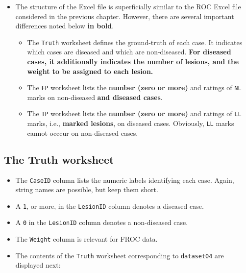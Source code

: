 \documentclass[]{book}
\providecommand{\tightlist}{%
  \setlength{\itemsep}{0pt}\setlength{\parskip}{0pt}}
\begin{document}
\begin{itemize}
\item
  The structure of the Excel file is superficially similar to the ROC Excel file considered in the previous chapter. However, there are several important differences noted below \textbf{in bold}.

  \begin{itemize}
  \tightlist
  \item
    The \texttt{Truth} worksheet defines the ground-truth of each case. It indicates which cases are diseased and which are non-diseased. \textbf{For diseased cases, it additionally indicates the number of lesions, and the weight to be assigned to each lesion.}
  \item
    The \texttt{FP} worksheet lists the \textbf{number (zero or more)} and ratings of \texttt{NL} marks on non-diseased \textbf{and diseased cases}.
  \item
    The \texttt{TP} worksheet lists the \textbf{number (zero or more)} and ratings of \texttt{LL} marks, i.e., \textbf{marked lesions}, on diseased cases. Obviously, \texttt{LL} marks cannot occcur on non-diseased cases.
  \end{itemize}
\end{itemize}

\hypertarget{the-truth-worksheet}{%
\subsection{The Truth worksheet}\label{the-truth-worksheet}}

\begin{itemize}
\tightlist
\item
  The \texttt{CaseID} column lists the numeric labels identifying each case. Again, string names are possible, but keep them short.
\item
  A \texttt{1}, or more, in the \texttt{LesionID} column denotes a diseased case.
\item
  A \texttt{0} in the \texttt{LesionID} column denotes a non-diseased case.
\item
  The \texttt{Weight} column is relevant for FROC data.
\item
  The contents of the \texttt{Truth} worksheet corresponding to \texttt{dataset04} are displayed next:
\end{itemize}
\end{document}

